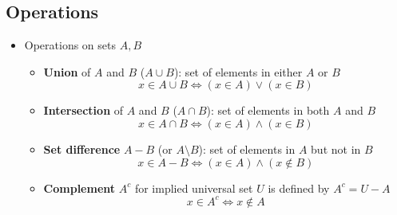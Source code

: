 \documentclass[11pt,twoside]{report}
\begin{document}
\subsection{Operations} 
\begin{itemize}



\item Operations on sets $A,B$ 
\begin{itemize} 
  \item \textbf{Union} of $A$ and $B$ ($A\cup B$): set of elements in either $A$ or $B$
\[ x\in A\cup B \iff  (x\in A)\vee (x\in B) \]
  \item \textbf{Intersection} of $A$ and $B$ ($A\cap B$): set of elements in both $A$ and $B$
\[ x\in A\cap B \iff  (x\in A)\wedge (x\in B) \]
  \item \textbf{Set difference} $A-B$ (or $A \setminus \!B$): set of elements in $A$ but not in $B$
\[ x\in A-B \iff (x\in A)\wedge (x\notin B) \]
  \item  \textbf{Complement} $A^c$ for implied universal set $U$ is defined by $A^c = U-A$
  \[ x\in A^c \iff x \notin A \]
\end{itemize}



\def\firstcircle{(0,0) circle (1.5cm)}
\def\secondcircle{(0:2cm) circle (1.5cm)}



\setlength{\parskip}{5mm}


\hspace{1in}


\end{itemize}
\end{document}
